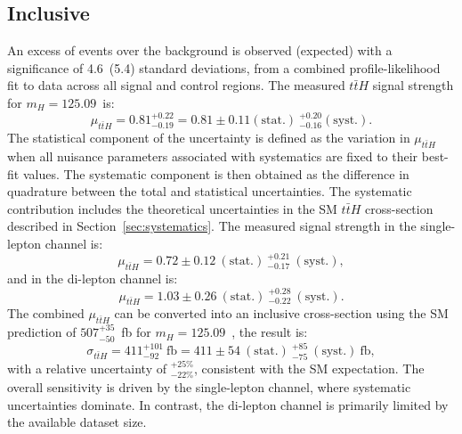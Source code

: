 \subsection{Inclusive}
An excess of events over the background is observed (expected) with a significance of 4.6~(5.4) standard deviations, from a combined profile-likelihood fit to data across all signal and control regions. The measured $t\bar{t}H$ signal strength for $m_{H}=125.09$~\GeV is:
\begin{equation}
    \mu_{t\bar{t}H} = 0.81^{+0.22}_{-0.19}=0.81 \pm 0.11 (\text{stat.})~^{+0.20}_{-0.16} (\text{syst.}). 
\end{equation}
The statistical component of the uncertainty is defined as the variation in $\mu_{t\bar{t}H}$ when all nuisance parameters associated with systematics are fixed to their best-fit values. The systematic component is then obtained as the difference in quadrature between the total and statistical uncertainties. The systematic contribution includes the theoretical uncertainties in the SM $t\bar{t}H$ cross-section described in Section~\ref{sec:systematics}. The measured signal strength in the single-lepton channel is:  
\begin{equation}
    \mu_{t\bar{t}H} = 0.72 \pm 0.12~(\text{stat.})~^{+0.21}_{-0.17}~(\text{syst.}),
\end{equation}
and in the di-lepton channel is:  
\begin{equation} 
    \mu_{t\bar{t}H} = 1.03 \pm 0.26~(\text{stat.})~^{+0.28}_{-0.22}~(\text{syst.}).
\end{equation}
The combined $\mu_{t\bar{t}H}$ can be converted into an inclusive cross-section using the SM prediction of $507^{+35}_{-50}$~fb for $m_{H}=125.09$~\GeV, the result is:
\begin{equation}
    \sigma_{t\bar{t}H} = 411^{+101}_{-92}~\text{fb} 
    = 411 \pm 54~(\text{stat.})~^{+85}_{-75}~(\text{syst.})~\text{fb},
\end{equation}
with a relative uncertainty of $^{+25\%}_{-22\%}$, consistent with the SM expectation.  
The overall sensitivity is driven by the single-lepton channel, where systematic uncertainties dominate.  
In contrast, the di-lepton channel is primarily limited by the available dataset size.\\
\\

